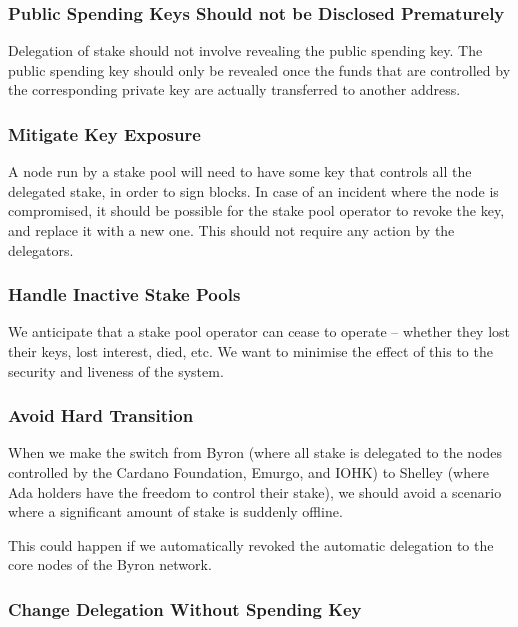 \documentclass[11pt,a4paper]{article}
\begin{document}
\subsubsection{Public Spending Keys Should not be Disclosed Prematurely}
\label{public-spending-keys-should-not-be-disclosed-prematurely}

Delegation of stake should not involve revealing the public spending
key. The public spending key should only be revealed once the funds that
are controlled by the corresponding private key are actually transferred
to another address.

\subsubsection{Mitigate Key Exposure}
\label{mitigate-key-exposure}

A node run by a stake pool will need to have some key that controls all
the delegated stake, in order to sign blocks. In case of an incident
where the node is compromised, it should be possible for the stake pool
operator to revoke the key, and replace it with a new one. This should
not require any action by the delegators.

\subsubsection{Handle Inactive Stake Pools}
\label{handle-inactive-stake-pools}

We anticipate that a stake pool operator can cease to operate -- whether
they lost their keys, lost interest, died, etc. We want to minimise the
effect of this to the security and liveness of the system.

\subsubsection{Avoid Hard Transition}
\label{avoid-hard-transition}

When we make the switch from Byron (where all stake is delegated to the
nodes controlled by the Cardano Foundation, Emurgo, and IOHK) to Shelley
(where Ada holders have the freedom to control their stake), we should
avoid a scenario where a significant amount of stake is suddenly
offline.

This could happen if we automatically revoked the automatic delegation
to the core nodes of the Byron network.

\subsubsection{Change Delegation Without Spending Key}
\label{change-delegation-without-spending-key}
\end{document}
